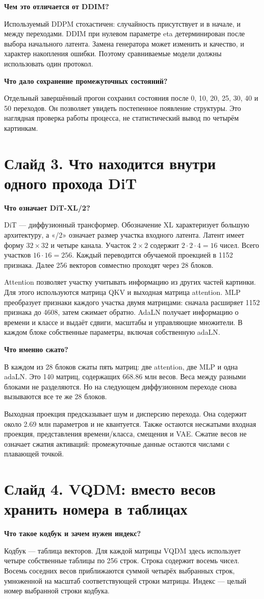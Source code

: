 \documentclass[a4paper,11pt]{article}
\newcommand{\slide}[2]{\clearpage\section*{Слайд #1. #2}}
\newcommand{\question}[1]{\par\textbf{#1}\par}
\begin{document}
\question{Чем это отличается от DDIM?}
Используемый DDPM стохастичен: случайность присутствует и в начале, и между
переходами. DDIM при нулевом параметре eta детерминирован после выбора
начального латента. Замена генератора может изменить и качество, и характер
накопления ошибки. Поэтому сравниваемые модели должны использовать один протокол.

\question{Что дало сохранение промежуточных состояний?}
Отдельный завершённый прогон сохранил состояния после 0, 10, 20, 25, 30, 40
и 50 переходов. Он позволяет увидеть постепенное появление структуры.
Это наглядная проверка работы процесса, не статистический вывод по четырём картинкам.

\slide{3}{Что находится внутри одного прохода DiT}
\question{Что означает DiT-XL/2?}
DiT --- диффузионный трансформер. Обозначение XL характеризует большую
архитектуру, а «/2» означает размер участка входного латента. Латент имеет
форму $32\times32$ и четыре канала. Участок $2\times2$ содержит
$2\cdot2\cdot4=16$ чисел. Всего участков $16\cdot16=256$.
Каждый переводится обучаемой проекцией в 1152 признака. Далее 256 векторов
совместно проходят через 28 блоков.

Attention позволяет участку учитывать информацию из других частей картинки.
Для этого используются матрица QKV и выходная матрица attention.
MLP преобразует признаки каждого участка двумя матрицами: сначала расширяет
1152 признака до 4608, затем сжимает обратно. AdaLN получает информацию
о времени и классе и выдаёт сдвиги, масштабы и управляющие множители.
В каждом блоке собственные параметры, включая собственную adaLN.

\question{Что именно сжато?}
В каждом из 28 блоков сжаты пять матриц: две attention, две MLP и одна adaLN.
Это 140 матриц, содержащих 668.86 млн весов. Веса между разными блоками
не разделяются. Но на следующем диффузионном переходе снова вызываются
все те же 28 блоков.

Выходная проекция предсказывает шум и дисперсию перехода. Она содержит
около 2.69 млн параметров и не квантуется. Также остаются несжатыми
входная проекция, представления времени/класса, смещения и VAE.
Сжатие весов не означает сжатия активаций: промежуточные данные остаются
числами с плавающей точкой.

\slide{4}{VQDM: вместо весов хранить номера в таблицах}
\question{Что такое кодбук и зачем нужен индекс?}
Кодбук --- таблица векторов. Для каждой матрицы VQDM здесь использует
четыре собственные таблицы по 256 строк. Строка содержит восемь чисел.
Восемь соседних весов приближаются суммой четырёх выбранных строк,
умноженной на масштаб соответствующей строки матрицы.
Индекс --- целый номер выбранной строки кодбука.
\end{document}
